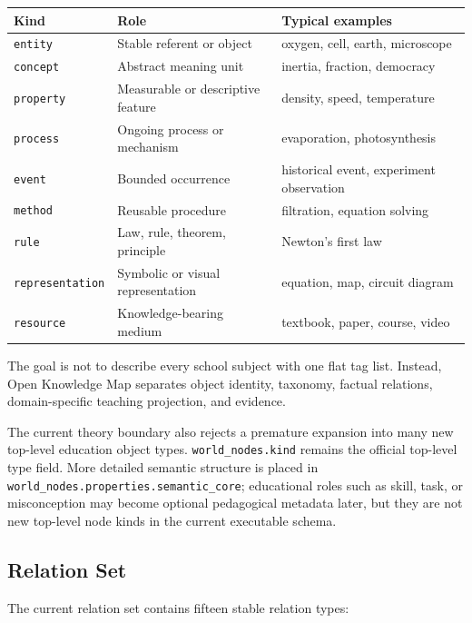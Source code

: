 \documentclass[11pt,letterpaper]{article}
\newcommand{\code}[1]{\nolinkurl{#1}}
\newcommand{\OKM}{Open Knowledge Map}
\begin{document}
\begin{center}
\small
\begin{tabular}{@{}lll@{}}
\toprule
\textbf{Kind} & \textbf{Role} & \textbf{Typical examples}\\
\midrule
\code{entity} & Stable referent or object & oxygen, cell, earth, microscope\\
\code{concept} & Abstract meaning unit & inertia, fraction, democracy\\
\code{property} & Measurable or descriptive feature & density, speed, temperature\\
\code{process} & Ongoing process or mechanism & evaporation, photosynthesis\\
\code{event} & Bounded occurrence & historical event, experiment observation\\
\code{method} & Reusable procedure & filtration, equation solving\\
\code{rule} & Law, rule, theorem, principle & Newton's first law\\
\code{representation} & Symbolic or visual representation & equation, map, circuit diagram\\
\code{resource} & Knowledge-bearing medium & textbook, paper, course, video\\
\bottomrule
\end{tabular}
\end{center}

The goal is not to describe every school subject with one flat tag list. Instead, \OKM{} separates object identity, taxonomy, factual relations, domain-specific teaching projection, and evidence.

The current theory boundary also rejects a premature expansion into many new top-level education object types. \code{world_nodes.kind} remains the official top-level type field. More detailed semantic structure is placed in \code{world_nodes.properties.semantic_core}; educational roles such as skill, task, or misconception may become optional pedagogical metadata later, but they are not new top-level node kinds in the current executable schema.

\subsection{Relation Set}

The current relation set contains fifteen stable relation types:
\end{document}
